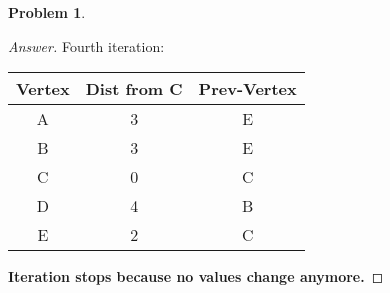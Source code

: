 \documentclass[11pt]{article}
\theoremstyle{definition}
\theoremstyle{definition}
\newtheorem{required}{Problem}
\theoremstyle{definition}
\begin{document}
\begin{required}
\begin{proof}[Answer]
Fourth iteration:\\
\begin{center}
\begin{tabular}[c]{|c|c|c|} 
	Vertex &Dist from C &Prev-Vertex \\\hline
	A &3 & E\\
	B &3& E\\
	C &0& C\\
	D &4 & B\\
	E &2& C\\
\end{tabular}
\end{center}

\textbf{Iteration stops because no values change anymore.}
\end{proof}


\end{required}

\end{document}
